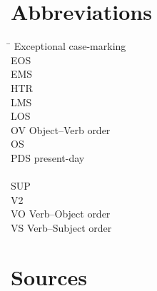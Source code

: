 \documentclass[output=paper]{langscibook}
\begin{document}
\section*{Abbreviations}

\begin{multicols}{2}
\begin{tabbing}
\hspace{1ex} \= \kill
{} \>  Exceptional case-marking    \\
EOS \>  \\
EMS \>  \\
HTR \>  \\
LMS \> \\
LOS \>  \\
OV  \> Object–Verb order \\
OS  \> \\
PDS \>  present-day \\
 \>  \\
SUP \>  \\
V2  \> \\
VO  \> Verb–Object order\\
VS  \> Verb–Subject order
\end{tabbing}
\end{multicols}

\section*{Sources}
\end{document}

